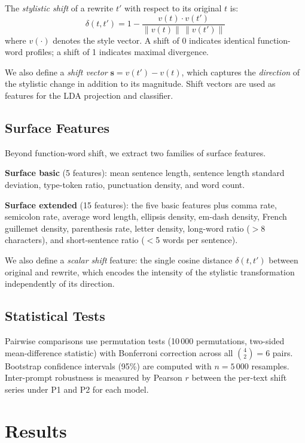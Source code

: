 \documentclass[11pt,a4paper]{article}
\begin{document}
The \emph{stylistic shift} of a rewrite $t'$ with respect to its
original $t$ is:
\begin{equation}
  \delta(t, t') = 1 - \frac{v(t) \cdot v(t')}{\|v(t)\|\,\|v(t')\|}
\end{equation}
where $v(\cdot)$ denotes the style vector.
A shift of 0 indicates identical function-word profiles;
a shift of 1 indicates maximal divergence.

We also define a \emph{shift vector} $\mathbf{s} = v(t') - v(t)$,
which captures the \emph{direction} of the stylistic change
in addition to its magnitude.
Shift vectors are used as features for the LDA projection and classifier.

\subsection{Surface Features}

Beyond function-word shift, we extract two families of surface features.

\textbf{Surface basic} (5 features): mean sentence length, sentence
length standard deviation, type-token ratio, punctuation density,
and word count.

\textbf{Surface extended} (15 features): the five basic features plus
comma rate, semicolon rate, average word length, ellipsis density,
em-dash density, French guillemet density, parenthesis rate, letter
density, long-word ratio ($>$8 characters), and short-sentence ratio
($<$5 words per sentence).

We also define a \emph{scalar shift} feature: the single cosine
distance $\delta(t, t')$ between original and rewrite, which encodes
the intensity of the stylistic transformation independently of its
direction.

\subsection{Statistical Tests}

Pairwise comparisons use permutation tests (10\,000 permutations,
two-sided mean-difference statistic) with Bonferroni correction
across all $\binom{4}{2} = 6$ pairs.
Bootstrap confidence intervals (95\%) are computed with $n = 5\,000$
resamples.
Inter-prompt robustness is measured by Pearson $r$ between the
per-text shift series under P1 and P2 for each model.

\section{Results}
\label{sec:results}
\end{document}

